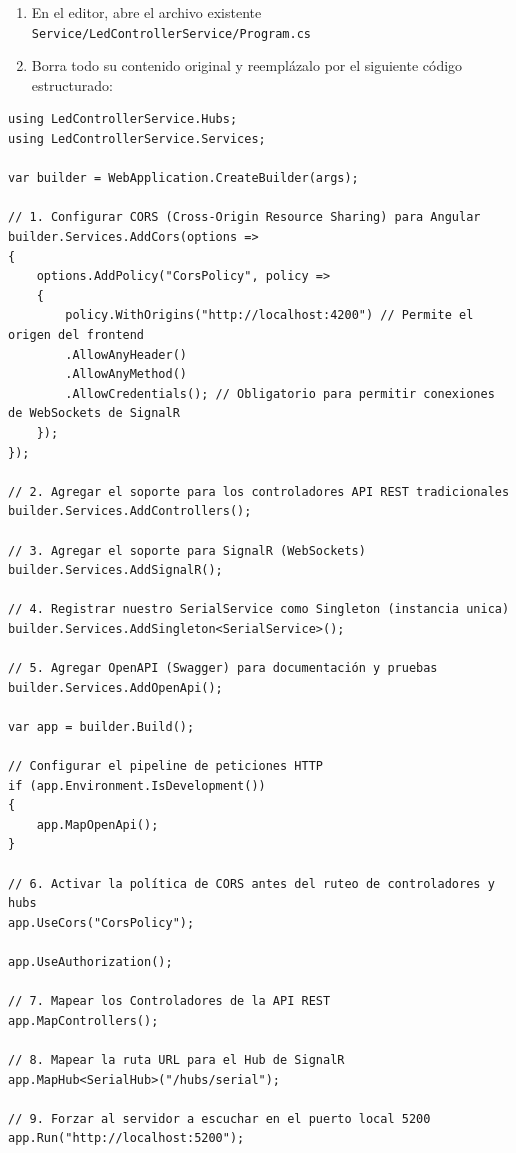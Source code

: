\documentclass[
10pt, %
a4paper, %
oneside, %
headinclude,footinclude, %
BCOR5mm, %
]{scrartcl}
\begin{document}
\begin{enumerate}
	\item En el editor, abre el archivo existente \texttt{Service/LedControllerService/Program.cs}
	\item Borra todo su contenido original y reemplázalo por el siguiente código estructurado:
\end{enumerate}

\begin{lstlisting}[style=VSCodeDark]
using LedControllerService.Hubs;
using LedControllerService.Services;

var builder = WebApplication.CreateBuilder(args);

// 1. Configurar CORS (Cross-Origin Resource Sharing) para Angular
builder.Services.AddCors(options =>
{
	options.AddPolicy("CorsPolicy", policy =>
	{
		policy.WithOrigins("http://localhost:4200") // Permite el origen del frontend
		.AllowAnyHeader()
		.AllowAnyMethod()
		.AllowCredentials(); // Obligatorio para permitir conexiones de WebSockets de SignalR
	});
});

// 2. Agregar el soporte para los controladores API REST tradicionales
builder.Services.AddControllers();

// 3. Agregar el soporte para SignalR (WebSockets)
builder.Services.AddSignalR();

// 4. Registrar nuestro SerialService como Singleton (instancia unica)
builder.Services.AddSingleton<SerialService>();

// 5. Agregar OpenAPI (Swagger) para documentación y pruebas
builder.Services.AddOpenApi();

var app = builder.Build();

// Configurar el pipeline de peticiones HTTP
if (app.Environment.IsDevelopment())
{
	app.MapOpenApi();
}

// 6. Activar la política de CORS antes del ruteo de controladores y hubs
app.UseCors("CorsPolicy");

app.UseAuthorization();

// 7. Mapear los Controladores de la API REST
app.MapControllers();

// 8. Mapear la ruta URL para el Hub de SignalR
app.MapHub<SerialHub>("/hubs/serial");

// 9. Forzar al servidor a escuchar en el puerto local 5200
app.Run("http://localhost:5200");

\end{lstlisting}
\end{document}

